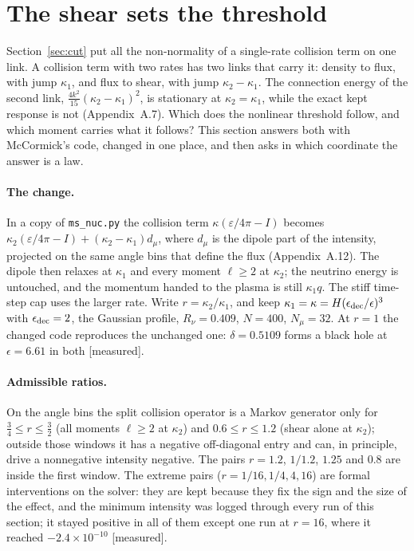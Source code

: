 \documentclass[11pt]{article}
\newcommand{\grade}[1]{\textsf{\small[#1]}}
\begin{document}
\section{The shear sets the threshold}\label{sec:link}

Section~\ref{sec:cut} put all the non-normality of a single-rate collision term on one link. A collision term with two rates has two links that carry it: density to flux, with jump $\kappa_1$, and flux to shear, with jump $\kappa_2-\kappa_1$. The connection energy of the second link, $\tfrac{4k^2}{15}(\kappa_2-\kappa_1)^2$, is stationary at $\kappa_2=\kappa_1$, while the exact kept response is not (Appendix~A.7). Which does the nonlinear threshold follow, and which moment carries what it follows? This section answers both with McCormick's code, changed in one place, and then asks in which coordinate the answer is a law.

\paragraph{The change.} In a copy of \texttt{ms\_nuc.py} the collision term $\kappa(\varepsilon/4\pi-I)$ becomes $\kappa_2(\varepsilon/4\pi-I)+(\kappa_2-\kappa_1)d_\mu$, where $d_\mu$ is the dipole part of the intensity, projected on the same angle bins that define the flux (Appendix~A.12). The dipole then relaxes at $\kappa_1$ and every moment $\ell\ge2$ at $\kappa_2$; the neutrino energy is untouched, and the momentum handed to the plasma is still $\kappa_1q$. The stiff time-step cap uses the larger rate. Write $r=\kappa_2/\kappa_1$, and keep $\kappa_1=\kappa=H(\epsilon_{\rm dec}/\epsilon)^3$ with $\epsilon_{\rm dec}=2$, the Gaussian profile, $R_\nu=0.409$, $N=400$, $N_\mu=32$. At $r=1$ the changed code reproduces the unchanged one: $\delta=0.5109$ forms a black hole at $\epsilon=6.61$ in both \grade{measured}.

\paragraph{Admissible ratios.} On the angle bins the split collision operator is a Markov generator only for $\tfrac34\le r\le\tfrac32$ (all moments $\ell\ge2$ at $\kappa_2$) and $0.6\le r\le1.2$ (shear alone at $\kappa_2$); outside those windows it has a negative off-diagonal entry and can, in principle, drive a nonnegative intensity negative. The pairs $r=1.2$, $1/1.2$, $1.25$ and $0.8$ are inside the first window. The extreme pairs ($r=1/16,1/4,4,16$) are formal interventions on the solver: they are kept because they fix the sign and the size of the effect, and the minimum intensity was logged through every run of this section; it stayed positive in all of them except one run at $r=16$, where it reached $-2.4\times10^{-10}$ \grade{measured}.
\end{document}
